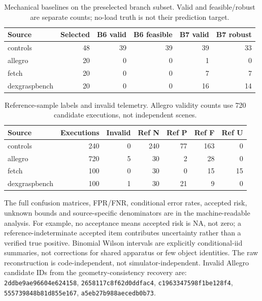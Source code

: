 \begin{table}[h]\centering\small\caption{Mechanical baselines on the preselected branch subset. Valid and feasible/robust are separate counts; no-load truth is not their prediction target.}
\begin{tabular}{lrrrrr}\toprule
Source & Selected & B6 valid & B6 feasible & B7 valid & B7 robust\\\midrule
controls & 48 & 39 & 39 & 39 & 33\\
allegro & 20 & 0 & 0 & 1 & 0\\
fetch & 20 & 0 & 0 & 7 & 7\\
dexgraspbench & 20 & 0 & 0 & 16 & 14\\
\bottomrule\end{tabular}
\end{table}
\begin{table}[h]\centering\small\caption{Reference-sample labels and invalid telemetry. Allegro validity counts use 720 candidate executions, not independent scenes.}
\begin{tabular}{lrrrrrr}\toprule
Source & Executions & Invalid & Ref N & Ref P & Ref F & Ref U\\\midrule
controls & 240 & 0 & 240 & 77 & 163 & 0\\
allegro & 720 & 5 & 30 & 2 & 28 & 0\\
fetch & 100 & 0 & 30 & 0 & 15 & 15\\
dexgraspbench & 100 & 1 & 30 & 21 & 9 & 0\\
\bottomrule\end{tabular}
\end{table}
The full confusion matrices, FPR/FNR, conditional error rates, accepted risk, unknown bounds and source-specific denominators are in the machine-readable analysis. For example, no acceptance means accepted risk is NA, not zero; a reference-indeterminate accepted item contributes uncertainty rather than a verified true positive. Binomial Wilson intervals are explicitly conditional-iid summaries, not corrections for shared apparatus or few object identities. The raw reconstruction is code-independent, not simulator-independent.
Invalid Allegro candidate IDs from the geometry-consistency recovery are: \texttt{2ddbe9ae96604e624158}, \texttt{2658117c8f62d0ddfac4}, \texttt{c1963347598f1be128f4}, \texttt{555739848b81d855e167}, \texttt{a5eb27b988aecedb0b73}.
